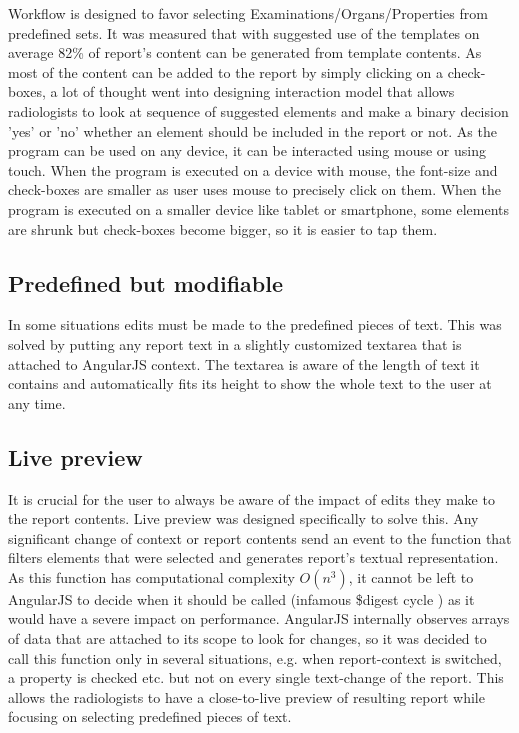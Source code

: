 \documentclass[12pt, twoside, openany]{report}
\theoremstyle{definition}
\begin{document}
Workflow is designed to favor selecting Examinations/Organs/Properties from predefined sets. It was measured that with suggested use of the templates on average 82\% of report's content can be generated from template contents. As most of the content can be added to the report by simply clicking on a check-boxes, a lot of thought went into designing interaction model that allows radiologists to look at sequence of suggested elements and make a binary decision 'yes' or 'no' whether an element should be included in the report or not. 
As the program can be used on any device, it can be interacted using mouse or using touch. When the program is executed on a device with mouse, the font-size and check-boxes are smaller as user uses mouse to precisely click on them. When the program is executed on a smaller device like tablet or smartphone, some elements are shrunk but check-boxes become bigger, so it is easier to tap them. 

\subsection{Predefined but modifiable}
In some situations edits must be made to the predefined pieces of text. This was solved by putting any report text in a slightly customized textarea that is attached to AngularJS context. The textarea is aware of the length of text it contains and automatically fits its height to show the whole text to the user at any time.


\subsection{Live preview}
It is crucial for the user to always be aware of the impact of edits they make to the report contents. Live preview was designed specifically to solve this. Any significant change of context or report contents send an event to the function that filters elements that were selected and generates report's textual representation. As this function has computational complexity $O(n^3)$, it cannot be left to AngularJS to decide when it should be called (infamous \$digest cycle \cite{angular-digest}) as it would have a severe impact on performance. AngularJS internally observes arrays of data that are attached to its scope to look for changes, so it was decided to call this function only in several situations, e.g. when report-context is switched, a property is checked etc. but not on every single text-change of the report. This allows the radiologists to have a close-to-live preview of resulting report while focusing on selecting predefined pieces of text.
\end{document}
